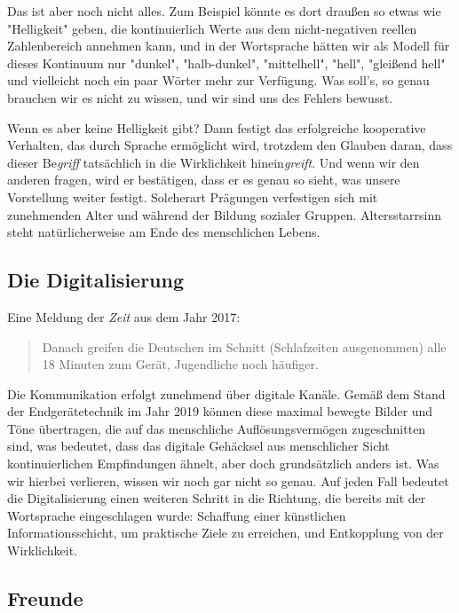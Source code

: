 \documentclass[12pt]{book}
\begin{document}
Das ist aber noch nicht alles. Zum Beispiel könnte es dort draußen so etwas wie "Helligkeit" geben, die kontinuierlich Werte aus dem nicht-negativen reellen Zahlenbereich annehmen kann, und in der Wortsprache hätten wir als Modell für dieses Kontinuum nur "dunkel", "halb-dunkel", "mittelhell", "hell", "gleißend hell" und vielleicht noch ein paar Wörter mehr zur Verfügung. Was soll's, so genau brauchen wir es nicht zu wissen, und wir sind uns des Fehlers bewusst. 

Wenn es aber keine Helligkeit gibt? Dann festigt das erfolgreiche kooperative Verhalten, das durch Sprache ermöglicht wird, trotzdem den Glauben daran, dass dieser Be\emph{griff} tatsächlich in die Wirklichkeit hinein\emph{greift}. Und wenn wir den anderen fragen, wird er bestätigen, dass er es genau so sieht, was unsere Vorstellung weiter festigt. Solcherart Prägungen verfestigen sich mit zunehmenden Alter und während der Bildung sozialer Gruppen. Altersstarrsinn steht natürlicherweise am Ende des menschlichen Lebens.

\subsection{Die Digitalisierung}

Eine Meldung der \emph{Zeit} aus dem Jahr 2017: 
\begin{quote}\begin{tcolorbox}
Danach greifen die Deutschen im Schnitt (Schlafzeiten ausgenommen) alle 18 Minuten zum Gerät, Jugendliche noch häufiger.
\end{tcolorbox}\end{quote}

Die Kommunikation erfolgt zunehmend über digitale Kanäle. Gemäß dem Stand der Endgerätetechnik im Jahr 2019 können diese maximal bewegte Bilder und Töne übertragen, die auf das menschliche Auflösungsvermögen zugeschnitten sind, was bedeutet, dass das digitale Gehäcksel aus menschlicher Sicht kontinuierlichen Empfindungen ähnelt, aber doch grundsätzlich anders ist. Was wir hierbei verlieren, wissen wir noch gar nicht so genau. Auf jeden Fall bedeutet die Digitalisierung einen weiteren Schritt in die Richtung, die bereits mit der Wortsprache eingeschlagen wurde: Schaffung einer künstlichen Informationsschicht, um praktische Ziele zu erreichen, und Entkopplung von der Wirklichkeit.

\subsection{Freunde}
\end{document}
